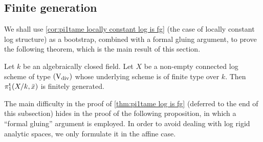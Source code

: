 \subsection{Finite generation} 
\label{ss:strat}

We shall use \cref{cor:pi1tame locally constant log is fg} (the case of locally constant log structure) as a bootstrap, combined with a formal gluing argument, to prove the following theorem, which is the main result of this section. 

\begin{thm} \label{thm:pi1tame log is fg}
    Let $k$ be an algebraically closed field.
    Let $X$ be a non-empty connected log scheme of type $(\mathrm{V}_{\rm div})$
    whose underlying scheme is of finite type over $k$.
    Then $\pi_1^{\mathrm{t}}(X/k,\bar x)$ is finitely generated.
\end{thm}

The main difficulty in the proof of \cref{thm:pi1tame log is fg} (deferred to the end of this subsection) hides in the proof of the following proposition, in which a ``formal gluing'' argument is employed. In order to avoid dealing with log rigid analytic spaces, we only formulate it in the affine case.


